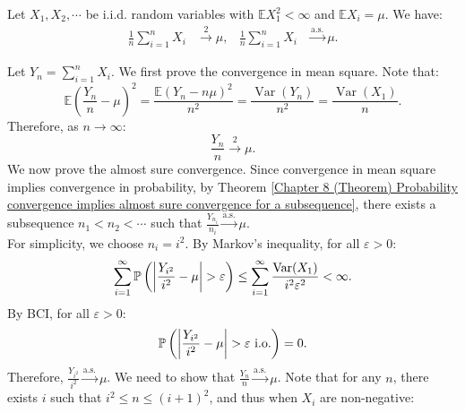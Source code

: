 \documentclass{huhtakm-template-book-v2}
\newcommand{\prob}{\mathbb{P}}
\newcommand{\expect}{\mathbb{E}}
\DeclareMathOperator{\Var}{Var}
\begin{document}
    \begin{thm}\named{SLLN with $\expect{X_{1}^{2}} < \infty$} Let $X_{1},X_{2},\cdots$ be i.i.d. random variables with $\expect{X_{1}^{2}} < \infty$ and $\expect{X_{i}} = \mu$. We have:
        \begin{align*}
            \frac{1}{n}\sum_{i = 1}^{n}X_{i} &\xrightarrow{2} \mu, & \frac{1}{n}\sum_{i = 1}^{n}X_{i} &\xrightarrow{\text{a.s.}} \mu.
        \end{align*}
    \end{thm}
    \begin{proofing}
        Let $Y_{n} = \sum_{i = 1}^{n}X_{i}$. We first prove the convergence in mean square. Note that:
        \begin{equation*}
            \expect\left(\frac{Y_{n}}{n}-\mu\right)^{2} = \frac{\expect(Y_{n}-n\mu)^{2}}{n^{2}} = \frac{\Var(Y_{n})}{n^{2}} = \frac{\Var(X_{1})}{n}.
        \end{equation*}
        Therefore, as $n \to \infty$:
        \begin{equation*}
            \frac{Y_{n}}{n} \xrightarrow{2} \mu.
        \end{equation*}
        We now prove the almost sure convergence. 
        Since convergence in mean square implies convergence in probability, by Theorem \ref{Chapter 8 (Theorem) Probability convergence implies almost sure convergence for a subsequence}, there exists a subsequence $n_{1} < n_{2} < \cdots$ such that $\frac{Y_{n_{i}}}{n_{i}} \xrightarrow{\text{a.s.}} \mu$.\\
        For simplicity, we choose $n_{i} = i^{2}$. By Markov's inequality, for all $\varepsilon > 0$:
        \begin{equation*}
            \sum_{i = 1}^{\infty}\prob\left(\abs{\frac{Y_{i^{2}}}{i^{2}}-\mu} > \varepsilon\right) \leq \sum_{i = 1}^{\infty}\frac{\Var(X_{1})}{i^{2}\varepsilon^{2}} < \infty.
        \end{equation*}
        By BCI, for all $\varepsilon > 0$:
        \begin{equation*}
            \prob\left(\abs{\frac{Y_{i^{2}}}{i^{2}}-\mu} > \varepsilon\text{ i.o.}\right) = 0.
        \end{equation*}
        Therefore, $\frac{Y_{i^{2}}}{i^{2}} \xrightarrow{\text{a.s.}} \mu$. We need to show that $\frac{Y_{n}}{n} \xrightarrow{\text{a.s.}} \mu$. Note that for any $n$, there exists $i$ such that $i^{2} \leq n \leq (i+1)^{2}$, and thus when $X_{i}$ are non-negative:
        \begin{equation*}

\end{equation*}
\end{proofing}
\end{document}

